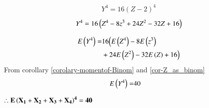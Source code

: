\documentclass[journal,12pt,twocolumn]{IEEEtran}
\begin{document}
\begin{align}
    {Y^4}=16{(Z-2)^4}
\end{align}
\begin{align}
    {Y^4}=16\left(Z^4-8z^3+24Z^2-32Z+16\right)
\end{align}

\begin{align}
\begin{split}
    E\left(Y^4\right)=&16\Bigl(E\left(Z^4\right)-8E\left(z^3\right)
    \\&+24E\left(Z^2\right)-32E\left(Z\right)+16\Bigr)
\end{split}    
\end{align}
From corollary \ref{corolary-momentof-Binom} and  \ref{cor-Z_as_binom}
\begin{align}
    E\left(Y^4\right)=&40 &
\end{align}

{\centering
$\mathbf{\therefore E\left(X_1+X_2 +X_3 +X_4\right)^4=40}$

}
\end{document}
